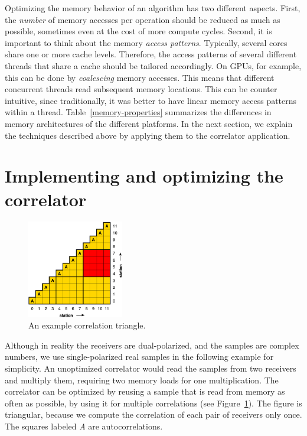 \documentclass{article}
\begin{document}
Optimizing the memory behavior of an algorithm has two different
aspects.  First, the \emph{number} of memory accesses per operation should be
reduced as much as possible, sometimes even at the cost of more
compute cycles.  Second, it is important to think about the memory
\emph{access patterns}. Typically, several cores share one or more cache
levels. Therefore, the access patterns of several different threads
that share a cache should be tailored accordingly. On GPUs, for
example, this can be done by \emph{coalescing} memory accesses.  This
means that different concurrent threads read subsequent memory
locations.  This can be counter intuitive, since traditionally, it was
better to have linear memory access patterns within a thread. Table~\ref{memory-properties} summarizes
the differences in memory architectures of the different platforms. In the
next section, we explain the techniques described above by applying
them to the correlator application.


\section{Implementing and optimizing the correlator}
\label{sec:optimizing}


\begin{figure}[t]
\begin{center}
\includegraphics[width=4.2cm]{figures/correlation-triangle.pdf}
\end{center}
\vspace{-0.5cm}
\caption{An example correlation triangle.}
\label{fig-correlation}
\end{figure}

Although in reality the receivers are dual-polarized, and the samples are complex numbers, 
we use single-polarized real samples in the following example for simplicity.
An unoptimized correlator would read the samples from two receivers and
multiply them, requiring two memory loads for one multiplication.
The correlator can be optimized by reusing a sample that is read from memory
as often as possible, by using it for multiple correlations (see
Figure~\ref{fig-correlation}).
The figure is triangular, because we compute
the correlation of each pair of receivers only once. The squares labeled \emph{A} are
autocorrelations.
\end{document}
